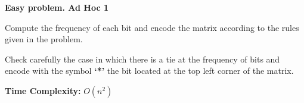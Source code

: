% 

\textbf{Easy problem. Ad Hoc 1}

Compute the frequency of each bit and encode the matrix according to the rules given in the problem.

Check carefully the case in which there is a tie at the frequency of bits and encode with the symbol \textbf{`*'} the bit
located at the top left corner of the matrix.

\textbf{Time Complexity:} $O(n^2)$